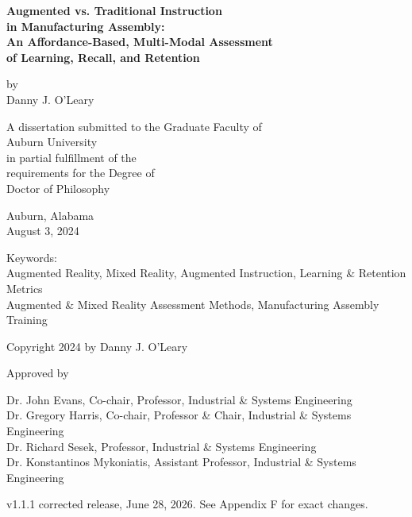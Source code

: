 \renewcommand\raggedchapter{\centering}

\begin{titlepage}
\setcounter{page}{1}
\begin{singlespace}
\center
\vspace*{48pt}

\textbf{Augmented vs. Traditional Instruction}\\
\textbf{in Manufacturing Assembly:}
\\
\textbf{An Affordance-Based, Multi-Modal Assessment}\\
\textbf{of Learning, Recall, and Retention}
\vspace{12pt}

by \\
\vspace{12pt}
Danny J. O'Leary
\vspace{48pt}

A dissertation submitted to the Graduate Faculty of \\
Auburn University \\
in partial fulfillment of the \\
requirements for the Degree of \\
Doctor of Philosophy \\
\vspace{12pt}

Auburn, Alabama \\
August 3, 2024
\vspace{48pt}

Keywords: \\
Augmented Reality, Mixed Reality, Augmented Instruction, Learning \& Retention Metrics \\
Augmented \& Mixed Reality Assessment Methods, Manufacturing Assembly Training \\
\vspace{24pt}

Copyright 2024 by Danny J. O'Leary
\vspace{24pt}

Approved by
\vspace{12pt}

Dr. John Evans, Co-chair, Professor, Industrial \& Systems Engineering \\
Dr. Gregory Harris, Co-chair, Professor \& Chair, Industrial \& Systems Engineering \\
Dr. Richard Sesek, Professor, Industrial \& Systems Engineering \\
Dr. Konstantinos Mykoniatis, Assistant Professor, Industrial \& Systems Engineering

\vspace{18pt}

{\small v1.1.1 corrected release, June 28, 2026. See Appendix F for exact changes.}

\end{singlespace}
\end{titlepage}
